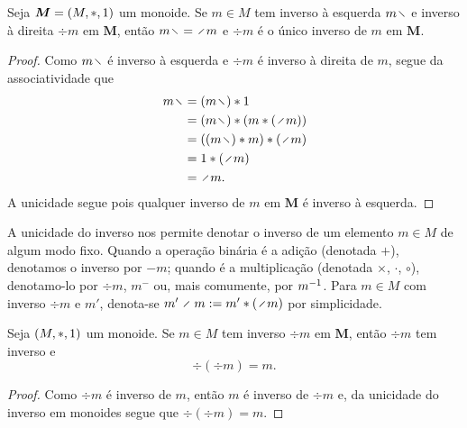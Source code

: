 \begin{proposition}
\label{prop:unic.inv}
Seja $\bm M = (M,\ast,1)$ um monoide. Se $m \in M$ tem inverso à esquerda $m \vid$ e inverso à direita $\div m$ em $\bm M$, então $m \vid = \div m$ e $\div m$ é o único inverso de $m$ em $\bm M$.
\end{proposition}
\begin{proof}
Como $m \vid$ é inverso à esquerda e $\div m$ é inverso à direita de $m$, segue da associatividade que
	\begin{align*}
	m \vid &= (m \vid) \opb \id \\
		&= (m \vid) \opb (m \opb (\div m)) \\
		&= ((m \vid) \opb m) \opb (\div m) \\
		&= \id \opb (\div m) \\
		&= \div m.
	\end{align*}
A unicidade segue pois qualquer inverso de $m$ em $\bm M$ é inverso à esquerda.
\end{proof}

\begin{notation}
A unicidade do inverso nos permite denotar o inverso de um elemento $m \in M$ de algum modo fixo. Quando a operação binária é a adição (denotada $+$), denotamos o inverso por $-m$; quando é a multiplicação (denotada $\times$, $\cdot$, $\circ$), denotamo-lo por $\div m$, $m^{-}$ ou, mais comumente, por $m^{-1}$. Para $m \in M$ com inverso $\div m$ e $m'$, denota-se $m' \div m := m' \opb (\div m)$ por simplicidade.
\end{notation}

\begin{proposition}
Seja $(M,\ast,1)$ um monoide. Se $m \in M$ tem inverso $\div m$ em $\bm M$, então $\div m$ tem inverso e
	\begin{equation*}
	\div(\div m) = m.
	\end{equation*}
\end{proposition}
\begin{proof}
Como $\div m$ é inverso de $m$, então $m$ é inverso de $\div m$ e, da unicidade do inverso em monoides segue que $\div(\div m) = m$.
\end{proof}


